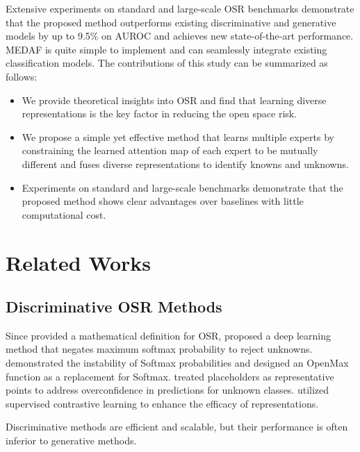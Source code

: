 \documentclass[letterpaper]{article} %
\begin{document}
Extensive experiments on standard and large-scale OSR benchmarks demonstrate that the proposed method outperforms existing discriminative and generative models by up to 9.5\% on AUROC and achieves new state-of-the-art performance. MEDAF is quite simple to implement and can seamlessly integrate existing classification models. The contributions of this study can be summarized as follows:
\begin{itemize}
\item We provide theoretical insights into OSR and find that learning diverse representations is the key factor in reducing the open space risk.
\item We propose a simple yet effective method that learns multiple experts by constraining the learned attention map of each expert to be mutually different and fuses diverse representations to identify knowns and unknowns.
\item Experiments on standard and large-scale benchmarks demonstrate that the proposed method shows clear advantages over baselines with little computational cost.
\end{itemize}

\section{Related Works}

\subsection{Discriminative OSR Methods}
Since \cite{scheirer2013open} provided a mathematical definition for OSR, \cite{hendrycks2016a} proposed a deep learning method that negates maximum softmax probability to reject unknowns. \cite{bendale2016towards} demonstrated the instability of Softmax probabilities and designed an OpenMax function as a replacement for Softmax. \cite{zhou2021learning} treated placeholders as representative points to address overconfidence in predictions for unknown classes. \cite{xu2023contrastive} utilized supervised contrastive learning to enhance the efficacy of representations.

Discriminative methods are efficient and scalable, but their performance is often inferior to generative methods.
\end{document}
